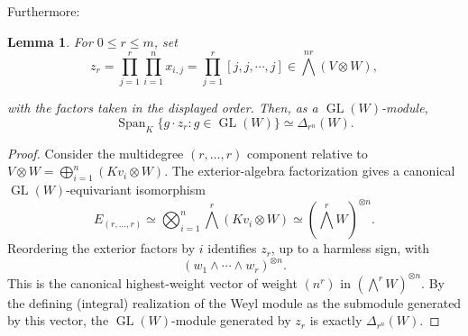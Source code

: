 \documentclass[10pt]{amsart}
\newtheorem{lemma}[theorem]{Lemma}
\theoremstyle{definition}
\theoremstyle{remark}
\newcommand{\GL}{\operatorname{GL}}
\newcommand{\Span}{\operatorname{Span}}
\begin{document}
Furthermore:

\begin{lemma}
For $0\le r\le m$, set
\begin{equation}\label{defpro}
z_r=\prod_{j=1}^{r}\prod_{i=1}^{n}x_{i,j}= \prod_{j=1}^{r}[j,j ,\cdots,j]\in\bigwedge^{nr}(V\otimes W),
\end{equation}
 
with the factors taken in the displayed order.  Then, as a $\GL(W)$-module,
\[
  \Span_K\{g\cdot  z_r:g\in\GL(W)\}\simeq  \Delta_{r^n}(W).
\]
\end{lemma}
\begin{proof}
Consider the multidegree $(r,\ldots,r)$ component relative to
$V\otimes W=\bigoplus_{i=1}^{n}(Kv_i\otimes W)$. The exterior-algebra
factorization gives a canonical $\GL(W)$-equivariant isomorphism
\[
 E_{(r,\ldots,r)}\simeq
 \bigotimes_{i=1}^{n}\bigwedge^r(Kv_i\otimes W)
 \simeq (\bigwedge^r W)^{\otimes n}.
\]
Reordering the exterior factors by $i$ identifies $z_r$, up to a harmless
sign, with
\[
 (w_1\wedge\cdots\wedge w_r)^{\otimes n}.
\]
This is the canonical highest-weight vector of weight $(n^r)$ in
$(\bigwedge^r W)^{\otimes n}$. By the defining (integral) realization
of the Weyl module as the submodule generated by this vector, the
$\GL(W)$-module generated by $z_r$ is exactly
$  \Delta_{r^n}(W)$. 
\end{proof}
\end{document}
